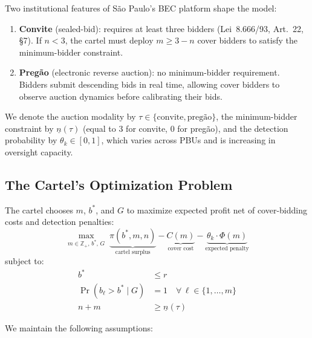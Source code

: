 Two institutional features of S\~ao Paulo's BEC platform shape the
model:

\begin{enumerate}
  \item \textbf{Convite} (sealed-bid): requires at least three bidders
    (Lei~8.666/93, Art.~22, \S7). If $n < 3$, the cartel must deploy
    $m \geq 3 - n$ cover bidders to satisfy the minimum-bidder
    constraint.
  \item \textbf{Preg\~ao} (electronic reverse auction): no
    minimum-bidder requirement. Bidders submit descending bids in real
    time, allowing cover bidders to observe auction dynamics before
    calibrating their bids.
\end{enumerate}

\noindent We denote the auction modality by $\tau \in \{\text{convite},
\text{preg\~ao}\}$, the minimum-bidder constraint by $\underline{n}(\tau)$
(equal to 3 for convite, 0 for preg\~ao), and the detection probability
by $\theta_k \in [0,1]$, which varies across PBUs and is increasing in
oversight capacity.


\subsection{The Cartel's Optimization Problem}
\label{sec:cartel_problem}

The cartel chooses $m$, $b^*$, and $G$ to maximize expected profit
net of cover-bidding costs and detection penalties:
\begin{equation}
  \max_{m \in \mathbb{Z}_+,\, b^*,\, G} \; \underbrace{\pi(b^*, m, n)
  }_{\text{cartel surplus}}
  - \underbrace{C(m)}_{\text{cover cost}}
  - \underbrace{\theta_k \cdot \Phi(m)}_{\text{expected penalty}}
  \label{eq:cartel_objective}
\end{equation}
subject to:
\begin{align}
  b^* &\leq r \label{eq:ref_price_constraint} \\
  \Pr(b_\ell > b^* \mid G) &= 1 \quad \forall \, \ell \in \{1, \ldots, m\}
    \label{eq:cover_above} \\
  n + m &\geq \underline{n}(\tau) \label{eq:min_bidder}
\end{align}

\noindent We maintain the following assumptions:

